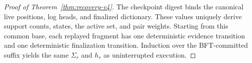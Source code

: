 \begin{proof}[Proof of Theorem~\ref{thm:recovery-v4}]
The checkpoint digest binds the canonical live positions, log heads, and
finalized dictionary.  These values uniquely derive support counts, states,
the active set, and pair weights.  Starting from this common base, each replayed
fragment has one deterministic evidence transition and one deterministic
finalization transition.  Induction over the BFT-committed suffix yields the
same $\Sigma_r$ and $h_r$ as uninterrupted execution.
\end{proof}
